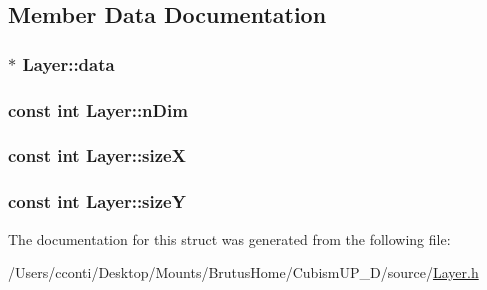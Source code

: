 \subsection{Member Data Documentation}
\hypertarget{struct_layer_ab85c711ae2d70e26fb05644abd588c50}{}
\subsubsection[{data}]{$\ast$ Layer\+::data}\label{struct_layer_ab85c711ae2d70e26fb05644abd588c50}
\hypertarget{struct_layer_ab937eda50c83c45e9bc814f6be6abb46}{}
\subsubsection[{n\+Dim}]{\setlength{\rightskip}{0pt plus 5cm}const int Layer\+::n\+Dim}\label{struct_layer_ab937eda50c83c45e9bc814f6be6abb46}
\hypertarget{struct_layer_a4904db3e1890920dd364930bb68efa07}{}
\subsubsection[{size\+X}]{\setlength{\rightskip}{0pt plus 5cm}const int Layer\+::size\+X}\label{struct_layer_a4904db3e1890920dd364930bb68efa07}
\hypertarget{struct_layer_a7ec60475ab6fdf004e5ed4be01b1a318}{}
\subsubsection[{size\+Y}]{\setlength{\rightskip}{0pt plus 5cm}const int Layer\+::size\+Y}\label{struct_layer_a7ec60475ab6fdf004e5ed4be01b1a318}


The documentation for this struct was generated from the following file\+:\begin{DoxyCompactItemize}
\item 
/\+Users/cconti/\+Desktop/\+Mounts/\+Brutus\+Home/\+Cubism\+U\+P\+\_\+D/source/\hyperlink{_layer_8h}{Layer.\+h}\end{DoxyCompactItemize}
